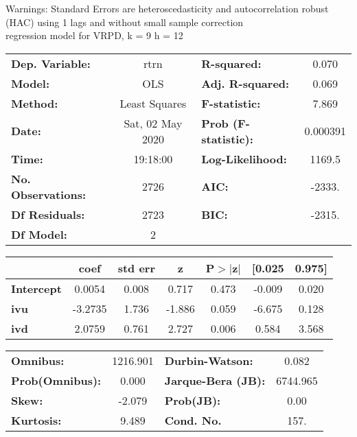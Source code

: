 Warnings: \newline
 [1] Standard Errors are heteroscedasticity and autocorrelation robust (HAC) using 1 lags and without small sample correction\\ 

regression model for VRPD, k = 9 h = 12\begin{center}
\begin{tabular}{lclc}
\toprule
\textbf{Dep. Variable:}    &       rtrn       & \textbf{  R-squared:         } &     0.070   \\
\textbf{Model:}            &       OLS        & \textbf{  Adj. R-squared:    } &     0.069   \\
\textbf{Method:}           &  Least Squares   & \textbf{  F-statistic:       } &     7.869   \\
\textbf{Date:}             & Sat, 02 May 2020 & \textbf{  Prob (F-statistic):} &  0.000391   \\
\textbf{Time:}             &     19:18:00     & \textbf{  Log-Likelihood:    } &    1169.5   \\
\textbf{No. Observations:} &        2726      & \textbf{  AIC:               } &    -2333.   \\
\textbf{Df Residuals:}     &        2723      & \textbf{  BIC:               } &    -2315.   \\
\textbf{Df Model:}         &           2      & \textbf{                     } &             \\
\bottomrule
\end{tabular}
\begin{tabular}{lcccccc}
                   & \textbf{coef} & \textbf{std err} & \textbf{z} & \textbf{P$> |$z$|$} & \textbf{[0.025} & \textbf{0.975]}  \\
\midrule
\textbf{Intercept} &       0.0054  &        0.008     &     0.717  &         0.473        &       -0.009    &        0.020     \\
\textbf{ivu}       &      -3.2735  &        1.736     &    -1.886  &         0.059        &       -6.675    &        0.128     \\
\textbf{ivd}       &       2.0759  &        0.761     &     2.727  &         0.006        &        0.584    &        3.568     \\
\bottomrule
\end{tabular}
\begin{tabular}{lclc}
\textbf{Omnibus:}       & 1216.901 & \textbf{  Durbin-Watson:     } &    0.082  \\
\textbf{Prob(Omnibus):} &   0.000  & \textbf{  Jarque-Bera (JB):  } & 6744.965  \\
\textbf{Skew:}          &  -2.079  & \textbf{  Prob(JB):          } &     0.00  \\
\textbf{Kurtosis:}      &   9.489  & \textbf{  Cond. No.          } &     157.  \\
\bottomrule
\end{tabular}
\end{center}

